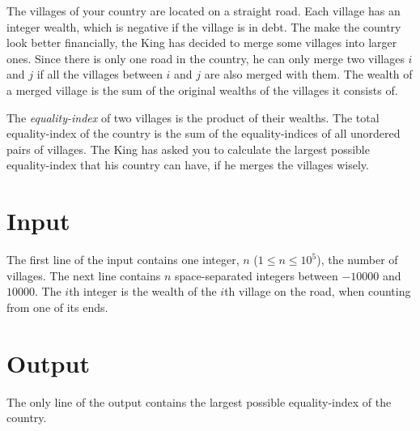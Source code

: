 
The villages of your country are located on a straight road.
Each village has an integer wealth, which is negative if the village is in debt.
The make the country look better financially, the King has decided to merge some villages into larger ones.
Since there is only one road in the country, he can only merge two villages $i$ and $j$ if all the villages between $i$ and $j$ are also merged with them.
The wealth of a merged village is the sum of the original wealths of the villages it consists of.

The \textit{equality-index} of two villages is the product of their wealths.
The total equality-index of the country is the sum of the equality-indices of all unordered pairs of villages.
The King has asked you to calculate the largest possible equality-index that his country can have, if he merges the villages wisely.

\section*{Input}
The first line of the input contains one integer, $n$ ($1 \leq n \leq 10^5$),  the number of villages.
The next line contains $n$ space-separated integers between $-10000$ and $10000$.
The $i$th integer is the wealth of the $i$th village on the road, when counting from one of its ends.

\section*{Output}
The only line of the output contains the largest possible equality-index of the country.
